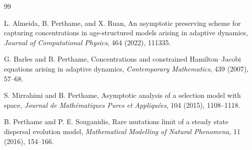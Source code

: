 \documentclass[11pt]{article}
\begin{document}
\begin{thebibliography}{99}

L. Almeida, B. Perthame, and X. Ruan,
An asymptotic preserving scheme for capturing concentrations in
age-structured models arising in adaptive dynamics,
\emph{Journal of Computational Physics}, 464 (2022), 111335.

G. Barles and B. Perthame,
Concentrations and constrained Hamilton--Jacobi equations arising in adaptive
dynamics,
\emph{Contemporary Mathematics}, 439 (2007), 57--68.

S. Mirrahimi and B. Perthame,
Asymptotic analysis of a selection model with space,
\emph{Journal de Math\'{e}matiques Pures et Appliqu\'{e}es}, 104 (2015),
1108--1118.

B. Perthame and P. E. Souganidis,
Rare mutations limit of a steady state dispersal evolution model,
\emph{Mathematical Modelling of Natural Phenomena}, 11 (2016), 154--166.

\end{thebibliography}
\end{document}
